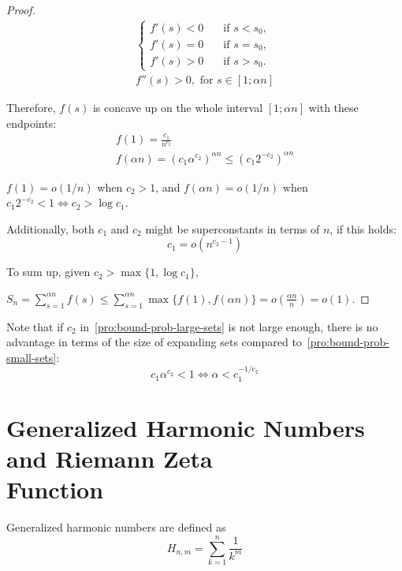 \begin{proof}
    \begin{gather}
        \begin{cases}
            f'(s)<0 & \quad \text{if } s<s_0,\\
            f'(s)=0 & \quad \text{if } s=s_0,\\
            f'(s)>0 & \quad \text{if } s>s_0.
        \end{cases}\\
        f''(s)>0,\text{ for }s\in[1;\alpha n]
    \end{gather}
    
    Therefore, $f(s)$ is concave up on the whole interval
    $[1;\alpha n]$ with these endpoints:
    \begin{gather}
        f(1)=\frac{c_1}{n^{c_2}}\\
        f(\alpha n)=\left(c_1\alpha^{c_2}\right)^{\alpha n}
        \leq\left(c_1 2^{-c_2}\right)^{\alpha n}
    \end{gather}
    
    $f(1)=o(1/n)$ when $c_2>1$, and $f(\alpha n)=o(1/n)$
    when $c_1 2^{-c_2}<1\iff c_2>\log c_1$.
    
    Additionally, both $c_1$ and $c_2$ might be superconstants in terms of $n$,
    if this holds:
    \begin{equation}
        c_1=o\left(n^{c_2-1}\right)
    \end{equation}

    To sum up, given $c_2>\max\{1,\log c_1\}$,
    
    $S_n=\sum_{s=1}^{\alpha n}{f(s)}
    \leq\sum_{s=1}^{\alpha n}{\max\{f(1),f(\alpha n)\}}
    =o\left(\frac{\alpha n}{n}\right)=o(1)$.
\end{proof}

Note that if $c_2$ in~\autoref{pro:bound-prob-large-sets} is not large enough,
there is no advantage in terms of the size of expanding sets
compared to~\autoref{pro:bound-prob-small-sets}:
\begin{equation}
    c_1\alpha^{c_2}<1\iff\alpha<c_1^{-1/c_2}
\end{equation}

\section[Generalized Harmonic Numbers and Riemann Zeta Function]
        {Generalized Harmonic Numbers and Riemann Zeta\\Function}

Generalized harmonic numbers are defined as
\begin{equation}
    H_{n,m}=\sum_{k=1}^{n}\frac{1}{k^m}
\end{equation}

